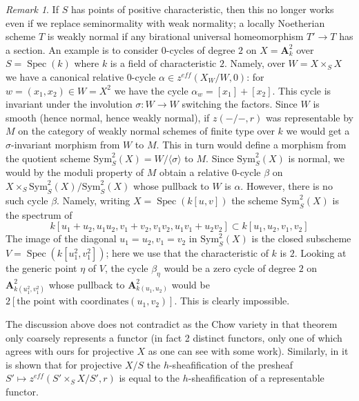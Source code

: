 \documentclass{stacks-project}
\theoremstyle{plain}
\theoremstyle{definition}
\theoremstyle{remark}
\newtheorem{remark}[subsection]{Remark}
\numberwithin{equation}{subsection}
\def\Spec{\mathop{\mathrm{Spec}}}
\begin{document}
\begin{remark}
\medskip\noindent
If $S$ has points of positive characteristic, then this no longer works
even if we replace seminormality with weak normality; a locally Noetherian
scheme $T$ is weakly normal if any birational universal homeomorphism
$T' \to T$ has a section. An example is to consider $0$-cycles of degree
$2$ on $X = \mathbf{A}^2_k$ over $S = \Spec(k)$ where $k$ is a field of
characteristic $2$. Namely, over $W = X \times_S X$ we have a canonical
relative $0$-cycle $\alpha \in z^{eff}(X_W/W, 0)$: for
$w = (x_1, x_2) \in W = X^2$ we have the cycle $\alpha_w = [x_1] + [x_2]$.
This cycle is invariant under the involution $\sigma : W \to W$ switching
the factors. Since $W$ is smooth (hence normal, hence weakly normal), if
$z(-/-, r)$ was representable by $M$ on the category of weakly normal
schemes of finite type over $k$ we would get a $\sigma$-invariant
morphism from $W$ to $M$. This in turn would define a morphism from the
quotient scheme $\text{Sym}^2_S(X) = W/\langle \sigma \rangle$ to $M$.
Since $\text{Sym}^2_S(X)$ is normal, we would by the moduli property of $M$
obtain a relative $0$-cycle $\beta$ on
$X \times_S \text{Sym}^2_S(X) / \text{Sym}^2_S(X)$
whose pullback to $W$ is $\alpha$. However, there is no such cycle $\beta$.
Namely, writing $X = \Spec(k[u, v])$ the scheme
$\text{Sym}^2_S(X)$ is the spectrum of
$$
k[u_1 + u_2, u_1u_2, v_1 + v_2, v_1v_2, u_1v_1 + u_2v_2]
\subset
k[u_1, u_2, v_1, v_2]
$$
The image of the diagonal $u_1 = u_2, v_1 = v_2$ in $\text{Sym}^2_S(X)$
is the closed subscheme $V = \Spec(k[u_1^2, v_1^2])$; here we use that
the characteristic of $k$ is $2$. Looking at the
generic point $\eta$ of $V$, the cycle $\beta_\eta$ would be a zero
cycle of degree $2$ on $\mathbf{A}^2_{k(u_1^2, v_1^2)}$
whose pullback to $\mathbf{A}^2_{k(u_1, u_2)}$ would be
$2[\text{the point with coordinates} (u_1, v_2)]$.
This is clearly impossible.

\medskip\noindent
The discussion above does not contradict \cite[Theorem 4.13]{KRC} as the Chow
variety in that theorem only coarsely represents a functor (in fact 2
distinct functors, only one of which agrees with ours for projective $X$
as one can see with some work). Similarly, in \cite[Section 4.4]{SV}
it is shown that for projective $X/S$ the $h$-sheafification of the presheaf
$S' \mapsto z^{eff}(S' \times_S X/S', r)$ is equal to the $h$-sheafification of
a representable functor.
\end{remark}
\end{document}

